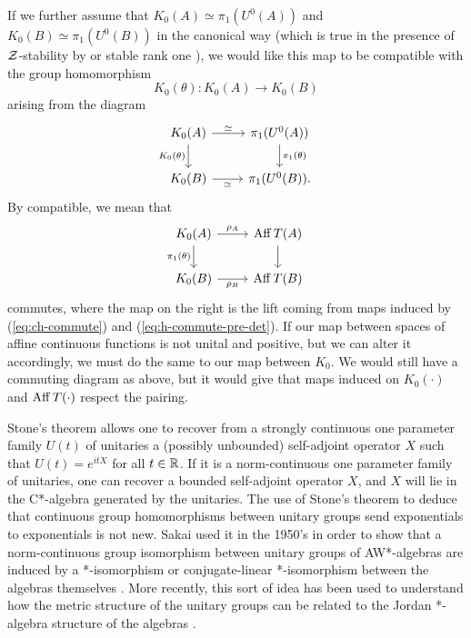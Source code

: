 \documentclass[12pt]{amsart}
\begin{document}
If we further assume that $K_0(A) \simeq \pi_1(U^0(A))$ and $K_0(B) \simeq \pi_1(U^0(B))$ in the canonical way (which is true in the presence of $\mathcal{Z}$-stability by \cite{Jiang97} or stable rank one \cite{Rieffel87}), we would like this map to be compatible with the group homomorphism
\begin{equation}
K_0(\theta): K_0(A) \to K_0(B)
\end{equation}
arising from the diagram 
\begin{equation}
\begin{tikzcd}
K_0(A) \arrow[r, "\simeq"] \arrow[d, "K_0(\theta)"'] & \pi_1(U^0(A)) \arrow[d, "\pi_1(\theta)"] \\
K_0(B) \arrow[r, "\simeq"']                           & \pi_1(U^0(B)).                          
\end{tikzcd}
\end{equation}
By compatible, we mean that 
\begin{equation}
\begin{tikzcd}
K_0(A) \arrow[d, "\pi_1(\theta)"'] \arrow[r, "\rho_A"] & \Aff T(A) \arrow[d] \\
K_0(B) \arrow[r, "\rho_B"']                          & \Aff T(B)          
\end{tikzcd}
\end{equation}
commutes, where the map on the right is the lift coming from maps induced by (\ref{eq:ch-commute}) and (\ref{eq:h-commute-pre-det}). If our map between spaces of affine continuous functions is not unital and positive, but we can alter it accordingly, we must do the same to our map between $K_0$. We would still have a commuting diagram as above, but it would give that maps induced on $K_0(\cdot)$ and $\operatorname{Aff} T(\cdot)$ respect the pairing. 

Stone's theorem \cite[Section X.5]{Conway19} allows one to recover from a strongly continuous one parameter family  $U(t)$ of unitaries a (possibly unbounded) self-adjoint operator $X$ such that $U(t) = e^{itX}$ for all $t \in \mathbb{R}$. If it is a norm-continuous one parameter family of unitaries, one can recover a bounded self-adjoint operator $X$, and $X$ will lie in the C*-algebra generated by the unitaries. 
The use of Stone's theorem to deduce that continuous group homomorphisms between unitary groups send exponentials to exponentials is not new. Sakai used it in the 1950's in order to show that a norm-continuous group isomorphism between  unitary groups of AW*-algebras are induced by a *-isomorphism or conjugate-linear *-isomorphism between the algebras themselves \cite{Sakai55}. More recently, this sort of idea has been used to understand how the metric structure of the unitary groups can be related to the Jordan *-algebra structure of the algebras \cite{HatoriMolnar14}.
\end{document}
